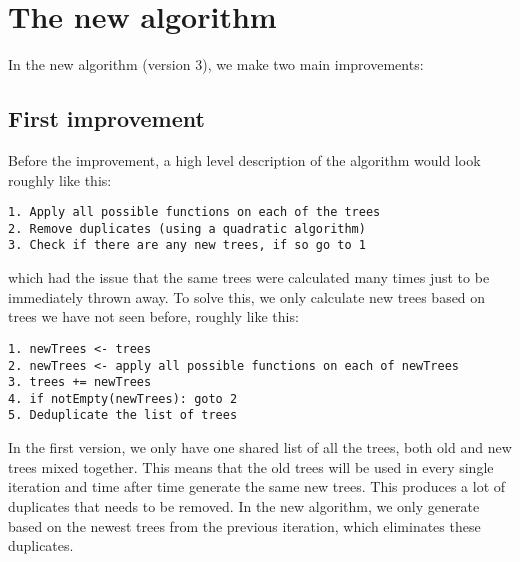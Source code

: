\chapter{The new algorithm}


In the new algorithm (version 3), we make two main improvements:


\section{First improvement}

Before the improvement, a high level description of the algorithm would look roughly like this:
\begin{verbatim}
1. Apply all possible functions on each of the trees
2. Remove duplicates (using a quadratic algorithm)
3. Check if there are any new trees, if so go to 1
\end{verbatim}

which had the issue that the same trees were calculated many times just to be immediately thrown away. To solve this, we only calculate new trees based on trees we have not seen before, roughly like this:

\begin{verbatim}
1. newTrees <- trees
2. newTrees <- apply all possible functions on each of newTrees
3. trees += newTrees
4. if notEmpty(newTrees): goto 2
5. Deduplicate the list of trees
\end{verbatim}

In the first version, we only have one shared list of all the trees, both old and new trees mixed together. This means that the old trees will be used in every single iteration and time after time generate the same new trees. This produces a lot of duplicates that needs to be removed. In the new algorithm, we only generate based on the newest trees from the previous iteration, which eliminates these duplicates.


